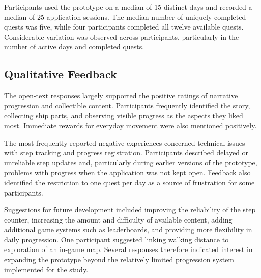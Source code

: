 Participants used the prototype on a median of 15 distinct days and recorded a median of 25 application sessions. The median number of uniquely completed quests was five, while four participants completed all twelve available quests. Considerable variation was observed across participants, particularly in the number of active days and completed quests.

\subsection{Qualitative Feedback}

The open-text responses largely supported the positive ratings of narrative progression and collectible content. Participants frequently identified the story, collecting ship parts, and observing visible progress as the aspects they liked most. Immediate rewards for everyday movement were also mentioned positively.

The most frequently reported negative experiences concerned technical issues with step tracking and progress registration. Participants described delayed or unreliable step updates and, particularly during earlier versions of the prototype, problems with progress when the application was not kept open. Feedback also identified the restriction to one quest per day as a source of frustration for some participants.

Suggestions for future development included improving the reliability of the step counter, increasing the amount and difficulty of available content, adding additional game systems such as leaderboards, and providing more flexibility in daily progression. One participant suggested linking walking distance to exploration of an in-game map. Several responses therefore indicated interest in expanding the prototype beyond the relatively limited progression system implemented for the study.
